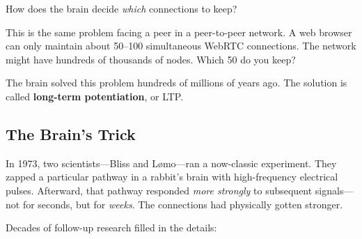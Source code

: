 \documentclass[nobib]{tufte-handout}
\begin{document}
How does the brain decide \emph{which} connections to keep?

This is the same problem facing a peer in a peer-to-peer network. A web browser can only maintain about 50--100 simultaneous WebRTC connections. The network might have hundreds of thousands of nodes. Which 50 do you keep?

The brain solved this problem hundreds of millions of years ago. The solution is called \textbf{long-term potentiation}, or LTP.

\subsection{The Brain's Trick}

In 1973, two scientists---Bliss and L\o mo---ran a now-classic experiment. They zapped a particular pathway in a rabbit's brain with high-frequency electrical pulses. Afterward, that pathway responded \emph{more strongly} to subsequent signals---not for seconds, but for \emph{weeks}. The connections had physically gotten stronger.

Decades of follow-up research filled in the details:
\end{document}
